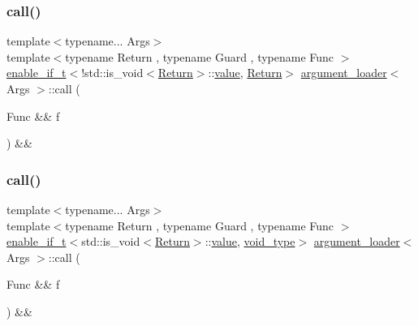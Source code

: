 \subsubsection{\texorpdfstring{call()}{call()}\hspace{0.1cm}{\footnotesize\ttfamily [1/2]}}
{\footnotesize\ttfamily template$<$typename... Args$>$ \\
template$<$typename Return , typename Guard , typename Func $>$ \\
\mbox{\hyperlink{detail_2common_8h_a012819c9e8b5e04872a271f50f8b8196}{enable\+\_\+if\+\_\+t}}$<$!std\+::is\+\_\+void$<$\mbox{\hyperlink{_python-ast_8h_abdae7f49d66ce8e500825bb53aa14901}{Return}}$>$\+::\mbox{\hyperlink{_s_d_l__opengl__glext_8h_a8ad81492d410ff2ac11f754f4042150f}{value}}, \mbox{\hyperlink{_python-ast_8h_abdae7f49d66ce8e500825bb53aa14901}{Return}}$>$ \mbox{\hyperlink{classargument__loader}{argument\+\_\+loader}}$<$ Args $>$\+::call (\begin{DoxyParamCaption}\item[{Func \&\&}]{f }\end{DoxyParamCaption}) \&\&\hspace{0.3cm}{\ttfamily [inline]}}

\mbox{\label{classargument__loader_a1671b063ca065c47975b4aa7853b403c}} 
\subsubsection{\texorpdfstring{call()}{call()}\hspace{0.1cm}{\footnotesize\ttfamily [2/2]}}
{\footnotesize\ttfamily template$<$typename... Args$>$ \\
template$<$typename Return , typename Guard , typename Func $>$ \\
\mbox{\hyperlink{detail_2common_8h_a012819c9e8b5e04872a271f50f8b8196}{enable\+\_\+if\+\_\+t}}$<$std\+::is\+\_\+void$<$\mbox{\hyperlink{_python-ast_8h_abdae7f49d66ce8e500825bb53aa14901}{Return}}$>$\+::\mbox{\hyperlink{_s_d_l__opengl__glext_8h_a8ad81492d410ff2ac11f754f4042150f}{value}}, \mbox{\hyperlink{structvoid__type}{void\+\_\+type}}$>$ \mbox{\hyperlink{classargument__loader}{argument\+\_\+loader}}$<$ Args $>$\+::call (\begin{DoxyParamCaption}\item[{Func \&\&}]{f }\end{DoxyParamCaption}) \&\&\hspace{0.3cm}{\ttfamily [inline]}}

